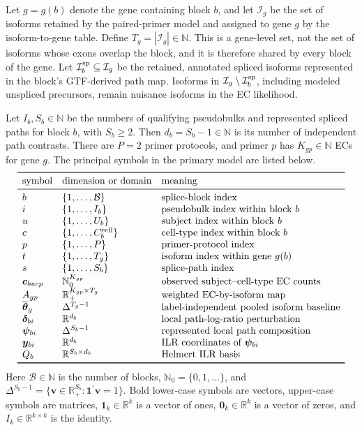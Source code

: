 \documentclass[11pt]{article}
\begin{document}
Let \(g=g(b)\) denote the gene containing block \(b\), and let \(\mathcal I_g\) be the set of isoforms retained by the paired-primer model and assigned to gene \(g\) by the isoform-to-gene table. Define \(T_g=|\mathcal I_g|\in\mathbb N\). This is a gene-level set, not the set of isoforms whose exons overlap the block, and it is therefore shared by every block of the gene. Let \(\mathcal I_b^{\rm sp}\subseteq\mathcal I_g\) be the retained, annotated spliced isoforms represented in the block's GTF-derived path map. Isoforms in \(\mathcal I_g\setminus\mathcal I_b^{\rm sp}\), including modeled unspliced precursors, remain nuisance isoforms in the EC likelihood.

Let \(I_b,S_b\in\mathbb N\) be the numbers of qualifying pseudobulks and represented spliced paths for block \(b\), with \(S_b\geq2\). Then \(d_b=S_b-1\in\mathbb N\) is its number of independent path contrasts. There are \(P=2\) primer protocols, and primer \(p\) has \(K_{gp}\in\mathbb N\) ECs for gene \(g\). The principal symbols in the primary model are listed below. \[
\begin{array}{lll}
\toprule
\text{symbol} & \text{dimension or domain} & \text{meaning}\\
\midrule
b & \{1,\ldots,\mathcal B\} & \text{splice-block index}\\
i & \{1,\ldots,I_b\} & \text{pseudobulk index within block }b\\
u & \{1,\ldots,U_b\} & \text{subject index within block }b\\
c & \{1,\ldots,C_b^{\rm cell}\} & \text{cell-type index within block }b\\
p & \{1,\ldots,P\} & \text{primer-protocol index}\\
t & \{1,\ldots,T_g\} & \text{isoform index within gene }g(b)\\
s & \{1,\ldots,S_b\} & \text{splice-path index}\\
\bm c_{bucp} & \mathbb N_0^{K_{gp}} & \text{observed subject--cell-type EC counts}\\
A_{gp} & \mathbb R_+^{K_{gp}\times T_g} & \text{weighted EC-by-isoform map}\\
\overline{\bm\theta}_g & \Delta^{T_g-1} & \text{label-independent pooled isoform baseline}\\
\bm\delta_{bi} & \mathbb R^{d_b} & \text{local path-log-ratio perturbation}\\
\bm\psi_{bi} & \Delta^{S_b-1} & \text{represented local path composition}\\
\bm y_{bi} & \mathbb R^{d_b} & \text{ILR coordinates of }\bm\psi_{bi}\\
Q_b & \mathbb R^{S_b\times d_b} & \text{Helmert ILR basis}\\
\bottomrule
\end{array}
\]
Here \(\mathcal B\in\mathbb N\) is the number of blocks, \(\mathbb N_0=\{0,1,\ldots\}\), and \(\Delta^{S_b-1}=\{\bm v\in\mathbb R_+^{S_b}:\bm1^\prime\bm v=1\}\). Bold lower-case symbols are vectors, upper-case symbols are matrices, \(\bm1_k\in\mathbb R^k\) is a vector of ones, \(\bm0_k\in\mathbb R^k\) is a vector of zeros, and \(I_k\in\mathbb R^{k\times k}\) is the identity.
\end{document}
